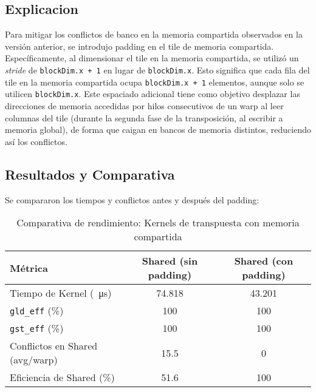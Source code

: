\documentclass[a4paper,11pt]{article}
\begin{document}
\subsection{Explicacion}
Para mitigar los conflictos de banco en la memoria compartida observados en la versión anterior, se introdujo padding en el tile de memoria compartida. Específicamente, al dimensionar el tile en la memoria compartida, se utilizó un \textit{stride} de \texttt{blockDim.x + 1} en lugar de \texttt{blockDim.x}. Esto significa que cada fila del tile en la memoria compartida ocupa \texttt{blockDim.x + 1} elementos, aunque solo se utilicen \texttt{blockDim.x}. Este espaciado adicional tiene como objetivo desplazar las direcciones de memoria accedidas por hilos consecutivos de un warp al leer columnas del tile (durante la segunda fase de la transposición, al escribir a memoria global), de forma que caigan en bancos de memoria distintos, reduciendo así los conflictos.

\subsection{Resultados y Comparativa}
Se compararon los tiempos y conflictos antes y después del padding:

\begin{table}[H]
\centering
\caption{Comparativa de rendimiento: Kernels de transpuesta con memoria compartida }
\begin{tabular}{lcc}
\toprule
\textbf{Métrica} & \textbf{Shared (sin padding)} & \textbf{Shared (con padding)} \\
\midrule
Tiempo de Kernel (\SI{}{\micro\second})       & 74.818  & 43.201  \\
\texttt{gld\_eff} (\%)               & 100     & 100     \\
\texttt{gst\_eff} (\%)               & 100     & 100     \\
Conflictos en Shared (avg/warp) & 15.5    & 0       \\
Eficiencia de Shared (\%)      & 51.6    & 100     \\
\bottomrule
\end{tabular}
\label{tab:shared_comparison_padding}
\end{table}
\end{document}
